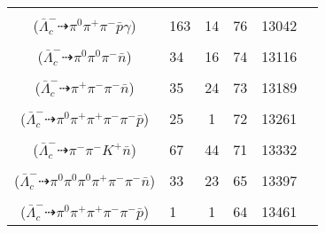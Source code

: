 \documentclass[landscape]{article}
\newcounter{rownumbers}
\newcommand\rn{\stepcounter{rownumbers}\arabic{rownumbers}}
\newcommand{\EOL}{\\} %
\newcommand{\topoTags}[1]{#1} %
\begin{document}
\begin{longtable}{clcccc}
\rn & \makecell[l]{ $ 
\bar{\Lambda}_{c}^{-} \rightarrow \rho^{-} \bar{\Sigma}^{0} ,
\rho^{-} \rightarrow \pi^{0} \pi^{-} ,
\bar{\Sigma}^{0} \rightarrow \bar{\Lambda} \gamma ,
\bar{\Lambda} \rightarrow \pi^{+} \bar{p} 
$ \\ ($
\bar{\Lambda}_{c}^{-} \dashrightarrow \pi^{0} \pi^{+} \pi^{-} \bar{p} \gamma 
$) } & \topoTags{163 & 14 & }76 & 13042 \EOL

\rn & \makecell[l]{ $ 
\bar{\Lambda}_{c}^{-} \rightarrow \pi^{0} \pi^{0} \bar{\Sigma}^{-} ,
\bar{\Sigma}^{-} \rightarrow \pi^{-} \bar{n} 
$ \\ ($
\bar{\Lambda}_{c}^{-} \dashrightarrow \pi^{0} \pi^{0} \pi^{-} \bar{n} 
$) } & \topoTags{34 & 16 & }74 & 13116 \EOL

\rn & \makecell[l]{ $ 
\bar{\Lambda}_{c}^{-} \rightarrow \pi^{-} K^{0} \bar{n} ,
K^{0} \rightarrow K_{S}^{0} ,
K_{S}^{0} \rightarrow \pi^{+} \pi^{-} 
$ \\ ($
\bar{\Lambda}_{c}^{-} \dashrightarrow \pi^{+} \pi^{-} \pi^{-} \bar{n} 
$) } & \topoTags{35 & 24 & }73 & 13189 \EOL

\rn & \makecell[l]{ $ 
\bar{\Lambda}_{c}^{-} \rightarrow \omega \bar{\Sigma}^{*-} ,
\omega \rightarrow \pi^{0} \pi^{+} \pi^{-} ,
\bar{\Sigma}^{*-} \rightarrow \pi^{-} \bar{\Lambda} ,
\bar{\Lambda} \rightarrow \pi^{+} \bar{p} 
$ \\ ($
\bar{\Lambda}_{c}^{-} \dashrightarrow \pi^{0} \pi^{+} \pi^{+} \pi^{-} \pi^{-} \bar{p} 
$) } & \topoTags{25 & 1 & }72 & 13261 \EOL

\rn & \makecell[l]{ $ 
\bar{\Lambda}_{c}^{-} \rightarrow \pi^{-} \pi^{-} K^{+} \bar{n} 
$ \\ ($
\bar{\Lambda}_{c}^{-} \dashrightarrow \pi^{-} \pi^{-} K^{+} \bar{n} 
$) } & \topoTags{67 & 44 & }71 & 13332 \EOL

\rn & \makecell[l]{ $ 
\bar{\Lambda}_{c}^{-} \rightarrow \pi^{-} \pi^{-} \eta \bar{\Sigma}^{+} ,
\eta \rightarrow \pi^{0} \pi^{0} \pi^{0} ,
\bar{\Sigma}^{+} \rightarrow \pi^{+} \bar{n} 
$ \\ ($
\bar{\Lambda}_{c}^{-} \dashrightarrow \pi^{0} \pi^{0} \pi^{0} \pi^{+} \pi^{-} \pi^{-} \bar{n} 
$) } & \topoTags{33 & 23 & }65 & 13397 \EOL

\rn & \makecell[l]{ $ 
\bar{\Lambda}_{c}^{-} \rightarrow \pi^{-} \eta \bar{\Lambda} ,
\eta \rightarrow \pi^{0} \pi^{+} \pi^{-} ,
\bar{\Lambda} \rightarrow \pi^{+} \bar{p} 
$ \\ ($
\bar{\Lambda}_{c}^{-} \dashrightarrow \pi^{0} \pi^{+} \pi^{+} \pi^{-} \pi^{-} \bar{p} 
$) } & \topoTags{1 & 1 & }64 & 13461 \EOL


\end{longtable}
\end{document}
